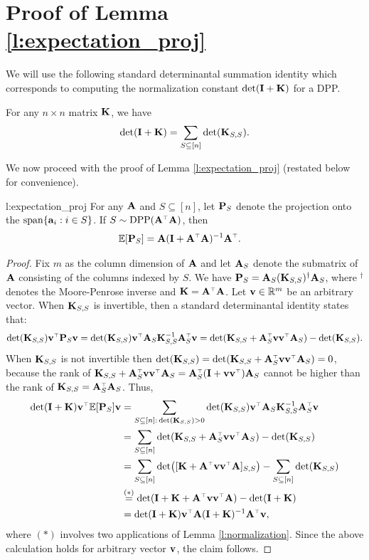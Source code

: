 \documentclass{article}
\begin{document}
  \section{Proof of Lemma \ref{l:expectation_proj}}
  We will use the following standard determinantal summation identity
  \citep[see Theorem 2.1 in][]{dpp-ml} which corresponds to computing the
normalization constant $\det(\I+\K)$ for a DPP.
  \begin{lemma}\label{l:normalization}
    For any $n\times n$ matrix $\K$, we have
    \begin{align*}
      \det(\I+\K) = \sum_{S\subseteq[n]}\det(\K_{S,S}).
      \end{align*}
    \end{lemma}
We now proceed with the proof of Lemma \ref{l:expectation_proj}
(restated below for convenience).
  \begin{replemma}{l:expectation_proj}
  For any $\A$ and $S\subseteq [n]$, let $\P_S$ denote the  
projection onto the $\mathrm{span}\{\a_i:i\in S\}$. If $S\sim \DPP(\A^\top\A)$, then
\begin{align*}
  \E[\P_S] & = \A(\I+\A^\top\A)^{-1}\A^\top.
\end{align*}
\end{replemma}
\begin{proof}
Fix $m$ as the column dimension of $\A$ and let $\A_S$ denote the
submatrix of $\A$ consisting of the columns 
indexed by $S$. We have $\P_S=\A_S(\K_{S,S})^\dagger\A_S$, where $^\dagger$
denotes the Moore-Penrose inverse and $\K=\A^\top\A$. Let
$\v\in\R^m$ be an arbitrary vector. When $\K_{S,S}$ is
invertible, then a standard determinantal 
identity states that:
  \begin{align*}
\det(\K_{S,S})\v^\top\P_S\v
    =\det(\K_{S,S})\v^\top\A_S\K_{S,S}^{-1}\A_S^\top\v =
    \det(\K_{S,S}+\A_S^\top\v\v^\top\A_S)-\det(\K_{S,S}). 
  \end{align*}
When $\K_{S,S}$ is not invertible then
$\det(\K_{S,S})=\det(\K_{S,S}+\A_S^\top\v\v^\top\A_S)=0$, because the
rank of $\K_{S,S}+\A_S^\top\v\v^\top\A_S=\A_S^\top(\I+\v\v^\top)\A_S$
cannot be higher than the rank of $\K_{S,S}=\A_S^\top\A_S$. Thus,
\begin{align*}
  \det(\I+\K)\v^\top\E[\P_S]\v
  &= \sum_{S\subseteq[n]:\,\det(\K_{S,S})>0}\det(\K_{S,S})
\v^\top\A_S\K_{S,S}^{-1}\A_S^\top\v\\
  &=\sum_{S\subseteq[n]}\det(\K_{S,S}+\A_S^\top\v\v^\top\A_S)-\det(\K_{S,S})\\
  &=\sum_{S\subseteq[n]}\det\!\big([\K+\A^\top\v\v^\top\A]_{S,S}\big)-\sum_{S\subseteq[n]}\det(\K_{S,S})\\
  &\overset{(*)}{=}\det(\I + \K + \A^\top\v\v^\top\A) - \det(\I+\K)\\
  &=\det(\I+\K)\v^\top\A(\I+\K)^{-1}\A^\top\v,
\end{align*}
where $(*)$ involves two applications of Lemma \ref{l:normalization}. Since the above
calculation holds for arbitrary vector $\v$, the claim follows.
\end{proof}
\end{document}
